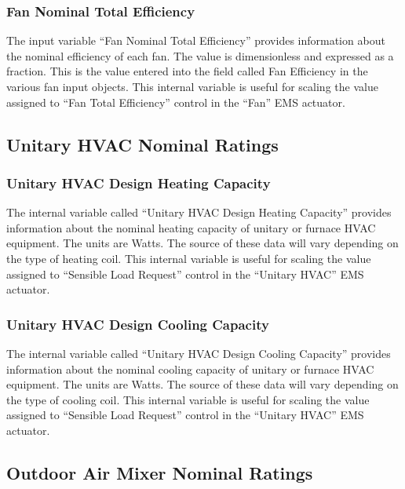 \subsubsection{Fan Nominal Total Efficiency}\label{fan-nominal-total-efficiency}

The input variable ``Fan Nominal Total Efficiency'' provides information about the nominal efficiency of each fan. The value is dimensionless and expressed as a fraction. This is the value entered into the field called Fan Efficiency in the various fan input objects. This internal variable is useful for scaling the value assigned to ``Fan Total Efficiency'' control in the ``Fan'' EMS actuator.

\subsection{Unitary HVAC Nominal Ratings}\label{unitary-hvac-nominal-ratings}

\subsubsection{Unitary HVAC Design Heating Capacity}\label{unitary-hvac-design-heating-capacity}

The internal variable called ``Unitary HVAC Design Heating Capacity'' provides information about the nominal heating capacity of unitary or furnace HVAC equipment. The units are Watts. The source of these data will vary depending on the type of heating coil. This internal variable is useful for scaling the value assigned to ``Sensible Load Request'' control in the ``Unitary HVAC'' EMS actuator.

\subsubsection{Unitary HVAC Design Cooling Capacity}\label{unitary-hvac-design-cooling-capacity}

The internal variable called ``Unitary HVAC Design Cooling Capacity'' provides information about the nominal cooling capacity of unitary or furnace HVAC equipment. The units are Watts. The source of these data will vary depending on the type of cooling coil. This internal variable is useful for scaling the value assigned to ``Sensible Load Request'' control in the ``Unitary HVAC'' EMS actuator.

\subsection{Outdoor Air Mixer Nominal Ratings}\label{outdoor-air-mixer-nominal-ratings}

